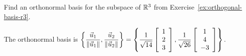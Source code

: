 \documentclass{ximera}
\begin{document}
\begin{exercise}
  Find an orthonormal basis for the subspace of $\R^3$ from Exercise~\ref{ex:orthogonal-basis-r3}.
  \begin{solution}
    The orthonormal basis is $\displaystyle\set{
      \frac{\vect{u}_1}{\norm{\vect{u}_1}},
      \frac{\vect{u}_2}{\norm{\vect{u}_2}}
    } = \set{
      \frac{1}{\sqrt{14}} \startmat{c} 1 \\ 2 \\ 3 \stopmat,
      \frac{1}{\sqrt{26}} \startmat{c} 1 \\ 4 \\
        -3 \stopmat
    }$.
  \end{solution}
\end{exercise}
\end{document}
